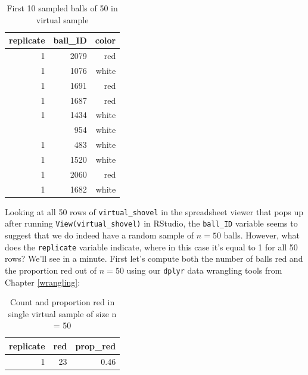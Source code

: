 \documentclass[12pt,]{krantz}
\makeatletter
\newenvironment{Shaded}{\begin{snugshade}}{\end{snugshade}}
\newcommand{\KeywordTok}[1]{\textcolor[rgb]{0.27,0.27,0.27}{\textbf{#1}}}
\newcommand{\DataTypeTok}[1]{\textcolor[rgb]{0.27,0.27,0.27}{#1}}
\newcommand{\DecValTok}[1]{\textcolor[rgb]{0.06,0.06,0.06}{#1}}
\newcommand{\StringTok}[1]{\textcolor[rgb]{0.5,0.5,0.5}{#1}}
\newcommand{\OperatorTok}[1]{\textcolor[rgb]{0.43,0.43,0.43}{\textbf{#1}}}
\newcommand{\NormalTok}[1]{#1}
\newenvironment{kframe}{%
\medskip{}
\setlength{\fboxsep}{.8em}
 \def\at@end@of@kframe{}%
 \ifinner\ifhmode%
  \def\at@end@of@kframe{\end{minipage}}%
  \begin{minipage}{\columnwidth}%
 \fi\fi%
 \def\FrameCommand##1{\hskip\@totalleftmargin \hskip-\fboxsep
 \colorbox{shadecolor}{##1}\hskip-\fboxsep
     \hskip-\linewidth \hskip-\@totalleftmargin \hskip\columnwidth}%
 \MakeFramed {\advance\hsize-\width
   \@totalleftmargin\z@ \linewidth\hsize
   \@setminipage}}%
 {\par\unskip\endMakeFramed%
 \at@end@of@kframe}
\renewenvironment{Shaded}{\begin{kframe}}{\end{kframe}}
\theoremstyle{definition}
\theoremstyle{definition}
\theoremstyle{definition}
\theoremstyle{remark}
\makeatother
\begin{document}
\begin{table}[H]

\caption{\label{tab:unnamed-chunk-261}First 10 sampled balls of 50 in virtual sample}
\centering
\fontsize{10}{12}\selectfont
\begin{tabular}[t]{rrr}
\toprule
replicate & ball\_ID & color\\
\midrule
1 & 2079 & red\\
1 & 1076 & white\\
1 & 1691 & red\\
1 & 1687 & red\\
1 & 1434 & white\\
\addlinespace
1 & 954 & white\\
1 & 483 & white\\
1 & 1520 & white\\
1 & 2060 & red\\
1 & 1682 & white\\
\bottomrule
\end{tabular}
\end{table}

Looking at all 50 rows of \texttt{virtual\_shovel} in the spreadsheet
viewer that pops up after running \texttt{View(virtual\_shovel)} in
RStudio, the \texttt{ball\_ID} variable seems to suggest that we do
indeed have a random sample of \(n=50\) balls. However, what does the
\texttt{replicate} variable indicate, where in this case it's equal to 1
for all 50 rows? We'll see in a minute. First let's compute both the
number of balls red and the proportion red out of \(n=50\) using our
\texttt{dplyr} data wrangling tools from Chapter \ref{wrangling}:

\begin{Shaded}
\end{Shaded}

\begin{table}[H]

\caption{\label{tab:unnamed-chunk-263}Count and proportion red in single virtual sample of size n = 50}
\centering
\fontsize{10}{12}\selectfont
\begin{tabular}[t]{rrr}
\toprule
replicate & red & prop\_red\\
\midrule
1 & 23 & 0.46\\
\bottomrule
\end{tabular}
\end{table}
\end{document}
